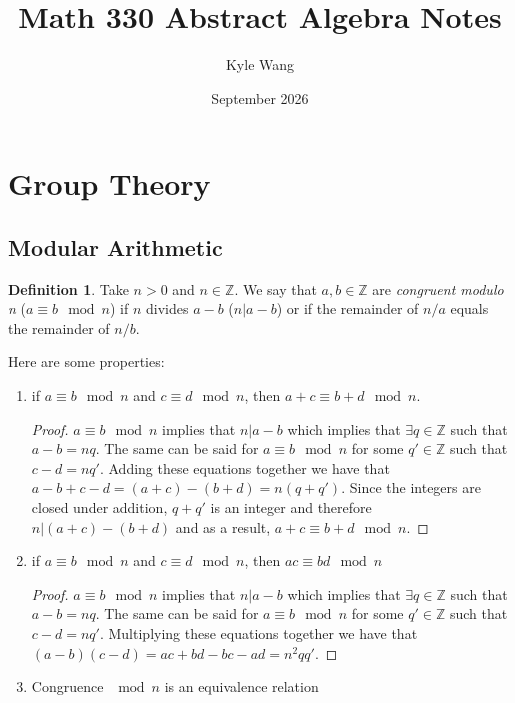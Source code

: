 \documentclass{article}
\title{Math 330 Abstract Algebra Notes}
\author{Kyle Wang}
\date{September 2026}
\newcommand{\Z}{\mathbb{Z}}
\theoremstyle{definition}
\newtheorem{definition}[theorem]{Definition}
\begin{document}
\maketitle
\tableofcontents
\section{Group Theory}
\subsection{Modular Arithmetic}
\begin{definition}
    Take $n>0$ and $n\in \Z $. We say that $a,b\in \Z$ are \textit{congruent modulo n} ($a\equiv b \mod{n}$) if $n$ divides $a-b$ ($n|a-b$) or if the remainder of $n/a$ equals the remainder of $n/b$.
\end{definition}
Here are some properties:
\begin{enumerate}
    \item if $a\equiv b \mod n$ and $c\equiv d \mod n$, then $a+c\equiv b+d \mod n$.
    \begin{proof}
        $a\equiv b \mod n$ implies that $n|a-b$ which implies that $\exists q \in \Z$ such that $a-b=nq$. The same can be said for $a\equiv b \mod n$ for some $q' \in \Z$ such that $c-d=nq'$. Adding these equations together we have that $a-b+c-d = (a+c)-(b+d) = n(q+q')$. Since the integers are closed under addition, $q+q'$ is an integer and therefore $n|(a+c)-(b+d)$ and as a result, $a+c\equiv b+d \mod n$.
    \end{proof}
    \item if $a\equiv b \mod n$ and $c\equiv d \mod n$, then $ac\equiv bd \mod n$
    \begin{proof}
        $a\equiv b \mod n$ implies that $n|a-b$ which implies that $\exists q \in \Z$ such that $a-b=nq$. The same can be said for $a\equiv b \mod n$ for some $q' \in \Z$ such that $c-d=nq'$. Multiplying these equations together we have that $(a-b)(c-d) = ac+bd-bc-ad = n^2qq'$. 
    \end{proof}
    \item Congruence $\!\!\!\!\mod n$ is an equivalence relation
\end{enumerate}
\end{document}
